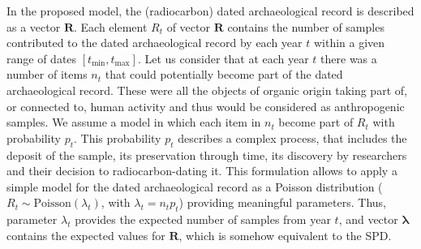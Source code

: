 \documentclass[a4paper]{article}
\begin{document}
In the proposed model, the (radiocarbon) dated archaeological record is described as a vector $\bm{R}$. Each element $R_t$ of vector $\bm{R}$ contains the number of samples contributed to the dated archaeological record by each year $t$ within a given range of dates $\left[t_{\min},t_{\max}\right]$. Let us consider that at each year $t$ there was a number of items $n_t$ that could potentially become part of the dated archaeological record. These were all the objects of organic origin taking part of, or connected to, human activity and thus would be considered as anthropogenic samples. We assume a model in which each item in $n_t$ become part of $R_t$ with probability $p_t$. This probability $p_t$ describes a complex process, that includes the deposit of the sample, its preservation through time, its discovery by researchers and their decision to radiocarbon-dating it. %
This formulation allows to apply a simple model for the dated archaeological record as a Poisson distribution ($R_t \sim \mathrm{Poisson}(\lambda_t)$, with $\lambda_t=n_tp_t$) providing meaningful parameters. Thus, parameter $\lambda_t$ provides the expected number of samples from year $t$, and vector $\bm{\lambda}$ contains the expected values for $\bm{R}$, which is somehow equivalent to the SPD.
\\
\end{document}
